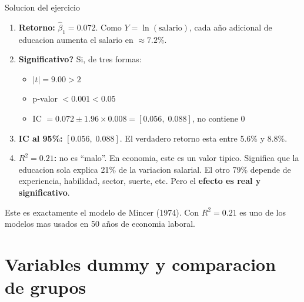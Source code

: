 \documentclass[aspectratio=169, 11pt]{beamer}
\begin{document}
\begin{frame}{Solucion del ejercicio}
\small
\begin{enumerate}\setlength{\itemsep}{4pt}
  \item \textbf{Retorno:} $\hat{\beta}_1 = 0.072$. Como $Y = \ln(\text{salario})$, cada a\~no adicional de educacion aumenta el salario en $\approx 7.2\%$.

  \item \textbf{Significativo?} Si, de tres formas:
  \begin{itemize}\setlength{\itemsep}{1pt}
    \item $|t| = 9.00 > 2$ \checkmark
    \item p-valor $< 0.001 < 0.05$ \checkmark
    \item IC $= 0.072 \pm 1.96 \times 0.008 = [0.056,\; 0.088]$, no contiene 0 \checkmark
  \end{itemize}

  \item \textbf{IC al 95\%:} $[0.056,\; 0.088]$. El verdadero retorno esta entre 5.6\% y 8.8\%.

  \item \textbf{$R^2 = 0.21$:} no es ``malo''. En economia, este es un valor tipico. Significa que la educacion sola explica 21\% de la variacion salarial. El otro 79\% depende de experiencia, habilidad, sector, suerte, etc. Pero el \textbf{efecto es real y significativo}.
\end{enumerate}

\vspace{0.1cm}
\begin{alertblock}{}
\small Este es exactamente el modelo de Mincer (1974). Con $R^2 = 0.21$ es uno de los modelos mas usados en 50 a\~nos de economia laboral.
\end{alertblock}
\end{frame}

\section{Variables dummy y comparacion de grupos}
\end{document}
